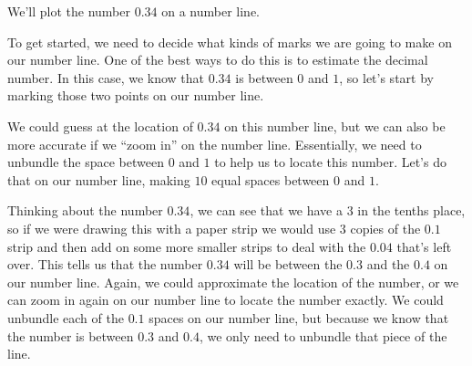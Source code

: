 \documentclass{ximera}
\begin{document}
\begin{example}
We'll plot the number $0.34$ on a number line.

To get started, we need to decide what kinds of marks we are going to make on our number line. One of the best ways to do this is to estimate the decimal number. In this case, we know that $0.34$ is between $0$ and $1$, so let's start by marking those two points on our number line.

\begin{image}
\end{image}

We could guess at the location of $0.34$ on this number line, but we can also be more accurate if we ``zoom in'' on the number line. Essentially, we need to unbundle the space between $0$ and $1$ to help us to locate this number. Let's do that on our number line, making $10$ equal spaces between $0$ and $1$.

\begin{image}
\end{image}

Thinking about the number $0.34$, we can see that we have a $3$ in the tenths place, so if we were drawing this with a paper strip we would use $3$ copies of the $0.1$ strip and then add on some more smaller strips to deal with the $0.04$ that's left over. This tells us that the number $0.34$ will be between the $0.3$ and the $0.4$ on our number line. Again, we could approximate the location of the number, or we can zoom in again on our number line to locate the number exactly. We could unbundle each of the $0.1$ spaces on our number line, but because we know that the number is between $0.3$ and $0.4$, we only need to unbundle that piece of the line.


\end{example}
\end{document}
